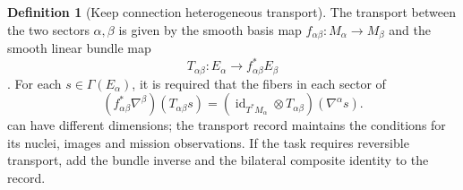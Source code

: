 \documentclass[12pt,a4paper,openany,notitlepage]{report}
\theoremstyle{plain}
\theoremstyle{definition}
\newtheorem{definition}[theorem]{Definition}
\theoremstyle{remark}
\begin{document}
\begin{CJK*}
\begin{definition}
[Keep connection heterogeneous transport]\label{hgov:geo:def:heterogeneous}
The transport between the two sectors $\alpha,\beta$ is given by the smooth basis map $f_{\alpha\beta}:M_\alpha\to M_\beta$ and the smooth linear bundle map \[
T_{\alpha\beta}:E_\alpha\longrightarrow f_{\alpha\beta}^*E_\beta
\]. For each $s\in\Gamma(E_\alpha)$, it is required that the fibers in each sector of \begin{equation}
\label{hgov:geo:eq:connection-intertwining}
(f_{\alpha\beta}^*\nabla^\beta)(T_{\alpha\beta}s)
=(\operatorname{id}_{T^*M_\alpha}\otimes T_{\alpha\beta})(\nabla^\alpha s).
\end{equation} can have different dimensions; the transport record maintains the conditions for its nuclei, images and mission observations. If the task requires reversible transport, add the bundle inverse and the bilateral composite identity to the record.\end{definition}



\end{CJK*}
\end{document}
